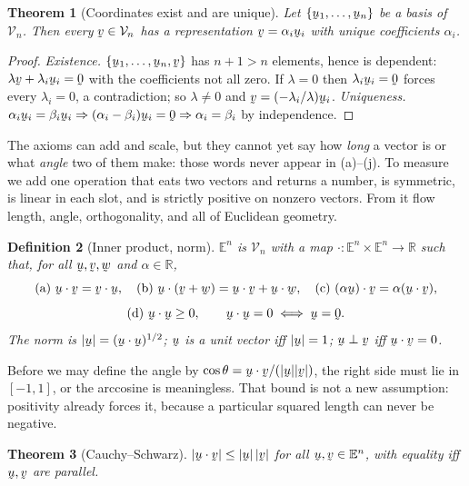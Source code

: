 \documentclass[17pt,a4paper]{extreport}
\DeclareRobustCommand{\vek}[1]{\underaccent{\tilde}{#1}}
\newcommand{\Rn}{\mathbb{R}}
\newcommand{\Vn}{\mathcal{V}_{n}}
\newcommand{\En}{\mathbb{E}^{n}}
\newcommand{\bu}{\vek{u}}
\newcommand{\bv}{\vek{v}}
\newcommand{\bw}{\vek{w}}
\newcommand{\bze}{\vek{0}}
\newcommand{\ip}[2]{#1\cdot#2}
\theoremstyle{scplain}
\newtheorem{theorem}{Theorem}[chapter]
\theoremstyle{scdefn}
\newtheorem{definition}[theorem]{Definition}
\theoremstyle{scplain}
\begin{document}
\begin{theorem}[Coordinates exist and are unique]\label{thm:coord}
Let $\{\bu_{1},\dots,\bu_{n}\}$ be a basis of $\Vn$. Then every
$\bv\in\Vn$ has a representation $\bv=\alpha_{i}\bu_{i}$ with unique
coefficients $\alpha_{i}$.
\end{theorem}

\begin{proof}
\emph{Existence.} $\{\bu_{1},\dots,\bu_{n},\bv\}$ has $n+1>n$ elements,
hence is dependent: $\lambda\bv+\lambda_{i}\bu_{i}=\bze$ with the
coefficients not all zero. If $\lambda=0$ then $\lambda_{i}\bu_{i}=\bze$
forces every $\lambda_{i}=0$, a contradiction; so $\lambda\neq0$ and
$\bv=(-\lambda_{i}/\lambda)\bu_{i}$. \emph{Uniqueness.}
$\alpha_{i}\bu_{i}=\beta_{i}\bu_{i}\Rightarrow(\alpha_{i}-\beta_{i})\bu_{i}
=\bze\Rightarrow\alpha_{i}=\beta_{i}$ by independence.
\end{proof}

\medskip
The axioms can add and scale, but they cannot yet say how \emph{long} a
vector is or what \emph{angle} two of them make: those words never appear
in (a)--(j). To measure we add one operation that eats two vectors and
returns a number, is symmetric, is linear in each slot, and is strictly
positive on nonzero vectors. From it flow length, angle, orthogonality,
and all of Euclidean geometry.

\begin{definition}[Inner product, norm]\label{def:ip}
$\En$ is $\Vn$ with a map $\cdot:\En\times\En\to\Rn$ such that, for all
$\bu,\bv,\bw$ and $\alpha\in\Rn$,
\[
\text{(a)}\ \ip\bu\bv=\ip\bv\bu,\quad
\text{(b)}\ \ip\bu{(\bv+\bw)}=\ip\bu\bv+\ip\bu\bw,\quad
\text{(c)}\ \ip{(\alpha\bu)}\bv=\alpha(\ip\bu\bv),
\]
\[
\text{(d)}\ \ip\bu\bu\ge0,\qquad \ip\bu\bu=0\iff\bu=\bze.
\]
The norm is $|\bu|=(\ip\bu\bu)^{1/2}$; $\bu$ is a unit vector iff
$|\bu|=1$; $\bu\perp\bv$ iff $\ip\bu\bv=0$.
\end{definition}

Before we may define the angle by $\cos\theta=\ip\bu\bv/(|\bu||\bv|)$, the
right side must lie in $[-1,1]$, or the arccosine is meaningless. That
bound is not a new assumption: positivity already forces it, because a
particular squared length can never be negative.

\begin{theorem}[Cauchy--Schwarz]\label{thm:cs}
$|\ip\bu\bv|\le|\bu|\,|\bv|$ for all $\bu,\bv\in\En$, with equality iff
$\bu,\bv$ are parallel.
\end{theorem}
\end{document}
